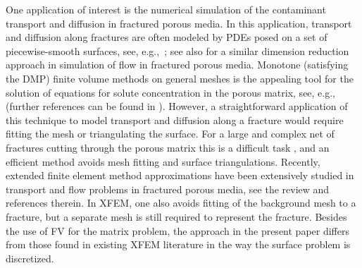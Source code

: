 \documentclass{article}
\begin{document}
One application of interest is the numerical simulation of the contaminant  transport and diffusion in fractured porous media. In this application, transport and diffusion along fractures are often modeled by PDEs posed on a set of piecewise-smooth surfaces, see, e.g.,~\cite{alboin2002modeling,fumagalli2013reduced,maryvska2005numerical,therrien1996three}; {see also \cite{alboin2002modeling,frac1,frac2,frac3} for a similar dimension reduction approach in simulation of flow in fractured porous media}.
Monotone (satisfying the DMP) finite volume methods on general meshes is the appealing tool for the solution of
equations for solute concentration in the porous matrix, see, e.g., ~\cite{ChernyshenkoFV7:14,Droniou:11,GaoWu:13,KapyrinFV7:14,LePotier:08,Lipnikov:12,ShengYuan:11}
(further references can be found in \cite{Droniou:14,FVCA7:14}).
 However, a straightforward application of this technique to model transport and diffusion along a fracture would require fitting the mesh or triangulating  the surface. For a large and complex net of fractures cutting through the porous matrix {this is a difficult task \cite{DPRF}, and} an efficient method avoids mesh fitting and surface triangulations. {
 Recently, extended finite element method  approximations have been extensively studied in transport and flow problems in fractured porous media, see the review \cite{flemisch2016review} and references therein.  In XFEM, one also avoids fitting of the background mesh to a fracture, but a separate mesh  is still required to represent the fracture.
 Besides the use of FV for the matrix problem, the approach in the present paper differs from those found in existing XFEM literature in the way the surface problem is discretized.}
\end{document}
